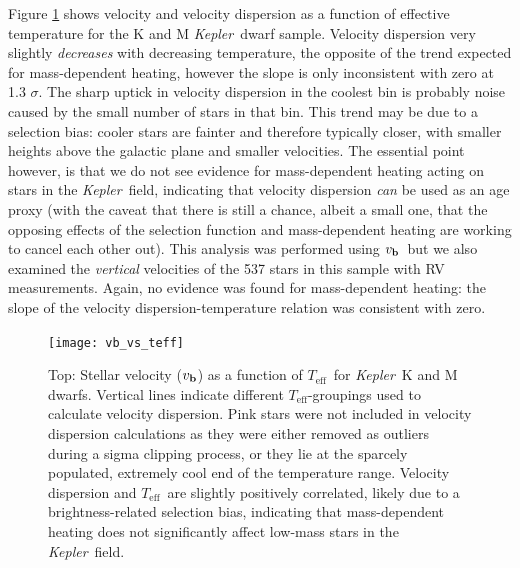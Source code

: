 \documentclass{aastex63}
\newcommand{\kepler}{{\it Kepler}}
\newcommand{\teff}{$T_{\mathrm{eff}}$}
\newcommand{\vb}{$v_{\bf b}$}
\begin{document}
Figure \ref{fig:vb_vs_teff} shows velocity and velocity dispersion as a
function of effective temperature for the K and M \kepler\ dwarf sample.
Velocity dispersion very slightly {\it decreases} with decreasing temperature,
the opposite of the trend expected for mass-dependent heating, however the
slope is only inconsistent with zero at 1.3 $\sigma$.
The sharp uptick in velocity dispersion in the coolest bin is probably noise
caused by the small number of stars in that bin.
This trend may be due to a selection bias: cooler stars are fainter and
therefore typically closer, with smaller heights above the galactic plane and
smaller velocities.
The essential point however, is that we do not see evidence for mass-dependent
heating acting on stars in the \kepler\ field, indicating that velocity
dispersion {\it can} be used as an age proxy (with the caveat that there is
still a chance, albeit a small one, that the opposing effects of the selection
function and mass-dependent heating are working to cancel each other out).
This analysis was performed using \vb\ but we also examined the {\it vertical}
velocities of the 537 stars in this sample with RV measurements.
Again, no evidence was found for mass-dependent heating: the slope of the
velocity dispersion-temperature relation was consistent with zero.
\begin{figure}
  \caption{
      Top: Stellar velocity (\vb) as a function of \teff\ for
      \kepler\ K and M dwarfs.
Vertical lines indicate different \teff-groupings used to calculate velocity
    dispersion.
Pink stars were not included in velocity dispersion calculations as they were
    either removed as outliers during a sigma clipping process, or they lie at
    the sparcely populated, extremely cool end of the temperature range.
    Velocity dispersion and \teff\ are slightly positively correlated, likely
    due to a brightness-related selection bias, indicating that mass-dependent
    heating does not significantly affect low-mass stars in the \kepler\
    field.
}
  \centering
    \texttt{[image: vb\_vs\_teff]}
\label{fig:vb_vs_teff}
\end{figure}
\end{document}
